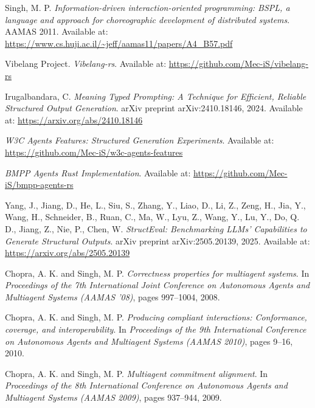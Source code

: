 \documentclass[11pt,a4paper]{article}
\begin{document}
	
	\begin{thebibliography}{9}
		
		Singh, M. P.
		\textit{Information-driven interaction-oriented programming: BSPL, a language and approach for choreographic development of distributed systems}.
		AAMAS 2011.
		Available at: \url{https://www.cs.huji.ac.il/~jeff/aamas11/papers/A4_B57.pdf}
		
		Vibelang Project.
		\textit{Vibelang-rs}.
		Available at: \url{https://github.com/Mec-iS/vibelang-rs}
		
		Irugalbandara, C.
		\textit{Meaning Typed Prompting: A Technique for Efficient, Reliable Structured Output Generation}.
		arXiv preprint arXiv:2410.18146, 2024.
		Available at: \url{https://arxiv.org/abs/2410.18146}
		
		\textit{W3C Agents Features: Structured Generation Experiments}.
		Available at: \url{https://github.com/Mec-iS/w3c-agents-features}
		
		\textit{BMPP Agents Rust Implementation}.
		Available at: \url{https://github.com/Mec-iS/bmpp-agents-rs}
		
		Yang, J., Jiang, D., He, L., Siu, S., Zhang, Y., Liao, D., Li, Z., Zeng, H., Jia, Y., Wang, H., Schneider, B., Ruan, C., Ma, W., Lyu, Z., Wang, Y., Lu, Y., Do, Q. D., Jiang, Z., Nie, P., Chen, W.
		\textit{StructEval: Benchmarking LLMs' Capabilities to Generate Structural Outputs}.
		arXiv preprint arXiv:2505.20139, 2025.
		Available at: \url{https://arxiv.org/abs/2505.20139}
		
		Chopra, A. K. and Singh, M. P.
		\textit{Correctness properties for multiagent systems}.
		In \textit{Proceedings of the 7th International Joint Conference on Autonomous Agents and Multiagent Systems (AAMAS '08)}, pages 997--1004, 2008.
		
		Chopra, A. K. and Singh, M. P.
		\textit{Producing compliant interactions: Conformance, coverage, and interoperability}.
		In \textit{Proceedings of the 9th International Conference on Autonomous Agents and Multiagent Systems (AAMAS 2010)}, pages 9--16, 2010.
		
		Chopra, A. K. and Singh, M. P.
		\textit{Multiagent commitment alignment}.
		In \textit{Proceedings of the 8th International Conference on Autonomous Agents and Multiagent Systems (AAMAS 2009)}, pages 937--944, 2009.
		

\end{thebibliography}
\end{document}
